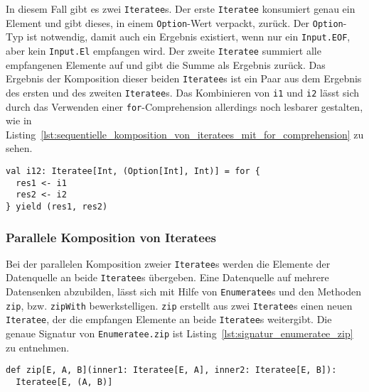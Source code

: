 In diesem Fall gibt es zwei \lstinline|Iteratee|s.
Der erste \lstinline|Iteratee| konsumiert genau ein Element und gibt dieses, in einem \lstinline|Option|-Wert verpackt, zurück.
Der \lstinline|Option|-Typ ist notwendig, damit auch ein Ergebnis existiert, wenn nur ein \lstinline|Input.EOF|, aber kein \lstinline|Input.El| empfangen wird.
Der zweite \lstinline|Iteratee| summiert alle empfangenen Elemente auf und gibt die Summe als Ergebnis zurück.
Das Ergebnis der Komposition dieser beiden \lstinline|Iteratee|s ist ein Paar aus dem Ergebnis des ersten und des zweiten \lstinline|Iteratee|s.
Das Kombinieren von \lstinline|i1| und \lstinline|i2| lässt sich durch das Verwenden einer \lstinline|for|-Comprehension allerdings noch lesbarer gestalten, wie in Listing~\ref{lst:sequentielle_komposition_von_iteratees_mit_for_comprehension} zu sehen.

\begin{lstlisting}[caption=Sequentielle Komposition von Iteratees mit for-Comprehension, label=lst:sequentielle_komposition_von_iteratees_mit_for_comprehension]
val i12: Iteratee[Int, (Option[Int], Int)] = for {
  res1 <- i1
  res2 <- i2
} yield (res1, res2)
\end{lstlisting}


\subsubsection{Parallele Komposition von Iteratees} %
\label{ssub:anwendung_parallele_komposition_von_iteratees}

Bei der parallelen Komposition zweier \lstinline|Iteratee|s werden die Elemente der Datenquelle an beide \lstinline|Iteratee|s übergeben.
Eine Datenquelle auf mehrere Datensenken abzubilden, lässt sich mit Hilfe von \lstinline|Enumeratee|s und den Methoden \lstinline|zip|, bzw. \lstinline|zipWith| bewerkstelligen.
\lstinline|zip| erstellt aus zwei \lstinline|Iteratee|s einen neuen \lstinline|Iteratee|, der die empfangen Elemente an beide \lstinline|Iteratee|s weitergibt.
Die genaue Signatur von \lstinline|Enumeratee.zip| ist Listing~\ref{lst:signatur_enumeratee_zip} zu entnehmen.

\begin{lstlisting}[caption=Die Signatur von Enumeratee.zip, label=lst:signatur_enumeratee_zip]
def zip[E, A, B](inner1: Iteratee[E, A], inner2: Iteratee[E, B]):
  Iteratee[E, (A, B)]
\end{lstlisting}

